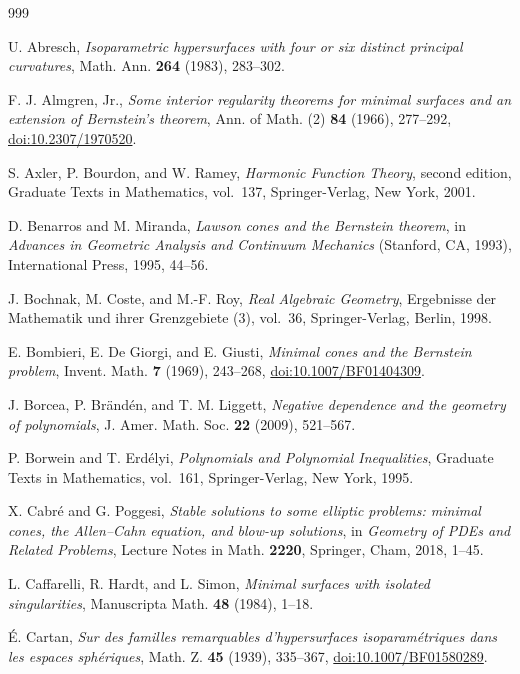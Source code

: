 \begin{thebibliography}{999}

U. Abresch,
\emph{Isoparametric hypersurfaces with four or six distinct principal
curvatures}, Math. Ann. \textbf{264} (1983), 283--302.

F. J. Almgren, Jr.,
\emph{Some interior regularity theorems for minimal surfaces and an
extension of Bernstein's theorem},
Ann. of Math. (2) \textbf{84} (1966), 277--292,
\href{https://doi.org/10.2307/1970520}{doi:10.2307/1970520}.

S. Axler, P. Bourdon, and W. Ramey,
\emph{Harmonic Function Theory}, second edition,
Graduate Texts in Mathematics, vol.~137, Springer-Verlag, New York, 2001.

D. Benarros and M. Miranda,
\emph{Lawson cones and the Bernstein theorem},
in \emph{Advances in Geometric Analysis and Continuum Mechanics}
(Stanford, CA, 1993), International Press, 1995, 44--56.

J. Bochnak, M. Coste, and M.-F. Roy,
\emph{Real Algebraic Geometry},
Ergebnisse der Mathematik und ihrer Grenzgebiete (3), vol.~36,
Springer-Verlag, Berlin, 1998.

E. Bombieri, E. De Giorgi, and E. Giusti,
\emph{Minimal cones and the Bernstein problem},
Invent. Math. \textbf{7} (1969), 243--268,
\href{https://doi.org/10.1007/BF01404309}{doi:10.1007/BF01404309}.

J. Borcea, P. Br\"and\'en, and T. M. Liggett,
\emph{Negative dependence and the geometry of polynomials},
J. Amer. Math. Soc. \textbf{22} (2009), 521--567.

P. Borwein and T. Erd\'elyi,
\emph{Polynomials and Polynomial Inequalities},
Graduate Texts in Mathematics, vol.~161, Springer-Verlag, New York, 1995.

X. Cabr\'e and G. Poggesi,
\emph{Stable solutions to some elliptic problems: minimal cones, the
Allen--Cahn equation, and blow-up solutions},
in \emph{Geometry of PDEs and Related Problems}, Lecture Notes in Math.
\textbf{2220}, Springer, Cham, 2018, 1--45.

L. Caffarelli, R. Hardt, and L. Simon,
\emph{Minimal surfaces with isolated singularities},
Manuscripta Math. \textbf{48} (1984), 1--18.

\'E. Cartan,
\emph{Sur des familles remarquables d'hypersurfaces isoparam\'etriques
dans les espaces sph\'eriques},
Math. Z. \textbf{45} (1939), 335--367,
\href{https://doi.org/10.1007/BF01580289}{doi:10.1007/BF01580289}.


\end{thebibliography}

